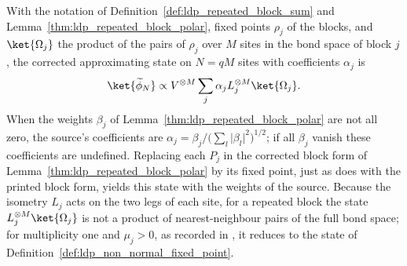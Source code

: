 \begin{definition}
    \label{def:ldp_repeated_block_state}
    \leanok
    With the notation of Definition~\ref{def:ldp_repeated_block_sum} and
    Lemma~\ref{thm:ldp_repeated_block_polar}, fixed points
    $\rho_j$ of the blocks, and $\ket{\Omega_j}$ the product of the pairs of
    $\rho_j$ over $M$ sites in the bond space of block $j$, the corrected
    approximating state on $N=qM$ sites with coefficients $\alpha_j$ is
    \begin{align*}
        \ket{\widetilde\phi_N}\propto V^{\otimes M}\sum_j\alpha_j
        L_j^{\otimes M}\ket{\Omega_j}.
    \end{align*}
    When the weights $\beta_j$ of Lemma~\ref{thm:ldp_repeated_block_polar} are
    not all zero, the source's coefficients are
    $\alpha_j=\beta_j/\bigl(\sum_l\lvert\beta_l\rvert^2\bigr)^{1/2}$; if all
    $\beta_j$ vanish these coefficients are undefined.
    Replacing each $P_j$ in the corrected block form of
    Lemma~\ref{thm:ldp_repeated_block_polar} by its fixed point, just as
    \cite[eq.~(S7)]{Malz2024Preparation} does with the printed block form,
    yields this state with the weights of the source. Because the isometry
    $L_j$ acts on the two legs of each site, for a repeated block the state
    $L_j^{\otimes M}\ket{\Omega_j}$ is not a product of nearest-neighbour pairs
    of the full bond space; for multiplicity one and $\mu_j>0$, as recorded in
    \cite{gap:mswc24_repeated_block_corrected_state}, it reduces to the state
    of Definition~\ref{def:ldp_non_normal_fixed_point}.
\end{definition}

